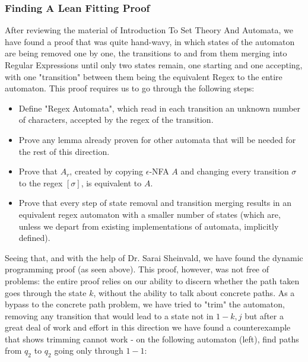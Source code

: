 \documentclass[]{article}
\begin{document}
\subsubsection{Finding A Lean Fitting Proof}
After reviewing the material of Introduction To Set Theory And Automata, we have found a proof that was quite hand-wavy, in which states of the automaton are being removed one by one, the transitions to and from them merging into Regular Expressions until only two states remain, one starting and one accepting, with one "transition" between them being the equivalent Regex to the entire automaton. This proof requires us to go through the following steps:
\begin{itemize}
	\item 
	Define "Regex Automata", which read in each transition an unknown number of characters, accepted by the regex of the transition.
	\item 
	Prove any lemma already proven for other automata that will be needed for the rest of this direction.
	\item 
	Prove that $A_r$, created by copying $\epsilon$-NFA $A$ and changing every transition $\sigma$ to the regex $[\sigma]$, is equivalent to $A$.
	\item
	Prove that every step of state removal and transition merging results in an equivalent regex automaton with a smaller number of states (which are, unless we depart from existing implementations of automata, implicitly defined).
\end{itemize}
Seeing that, and with the help of Dr. Sarai Sheinvald, we have found the dynamic programming proof (as seen above). This proof, however, was not free of problems: the entire proof relies on our ability to discern whether the path taken goes through the state $k$, without the ability to talk about concrete paths. As a bypass to the concrete path problem, we have tried to "trim" the automaton, removing any transition that would lead to a state not in $1-k,j$ but after a great deal of work and effort in this direction we have found a counterexample that shows trimming cannot work - on the following automaton (left), find paths from $q_2$ to $q_2$ going only through $1-1$:
\end{document}
